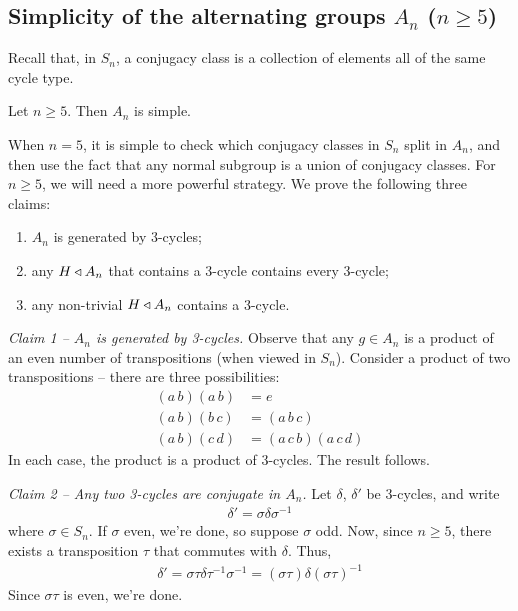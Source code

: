 \documentclass{../../template/note}
\begin{document}
    \subsection{Simplicity of the alternating groups $A_n$ ($n \geq 5$)}
    
    Recall that, in $S_n$, a conjugacy class is a collection of elements all of the same cycle type.

    \begin{theorem}
        Let $n \geq 5$. Then $A_n$ is simple.
    \end{theorem}
    
    When $n=5$, it is simple to check which conjugacy classes in $S_n$ split in $A_n$, and then use the fact that any normal subgroup is a union of conjugacy classes. For $n \geq 5$, we will need a more powerful strategy. We prove the following three claims:
    \begin{enumerate}
        \item $A_n$ is generated by 3-cycles;
        \item any $H \triangleleft A_n$ that contains a 3-cycle contains every 3-cycle;
        \item any non-trivial $H \triangleleft A_n$ contains a 3-cycle.
    \end{enumerate}
    
    \emph{Claim 1 -- $A_n$ is generated by 3-cycles.} Observe that any $g \in A_n$ is a product of an even number of transpositions (when viewed in $S_n$). Consider a product of two transpositions -- there are three possibilities:
    \begin{align*}
        (a\, b)(a\, b) &= e \\
        (a\, b)(b\, c) &= (a\, b\, c) \\
        (a\, b)(c\, d) &= (a\, c\, b)(a\, c\, d)
    \end{align*}
    In each case, the product is a product of 3-cycles. The result follows.
    
    \emph{Claim 2 -- Any two 3-cycles are conjugate in $A_n$.} Let $\delta$, $\delta'$ be 3-cycles, and write
    \begin{align*}
        \delta' = \sigma \delta \sigma^{-1}
    \end{align*}
    where $\sigma \in S_n$. If $\sigma$ even, we're done, so suppose $\sigma$ odd. Now, since $n \geq 5$, there exists a transposition $\tau$ that commutes with $\delta$. Thus,
    \begin{align*}
        \delta' = \sigma \tau \delta \tau^{-1} \sigma^{-1} = (\sigma \tau)\delta(\sigma \tau)^{-1}
    \end{align*}
    Since $\sigma \tau$ is even, we're done.
\end{document}
